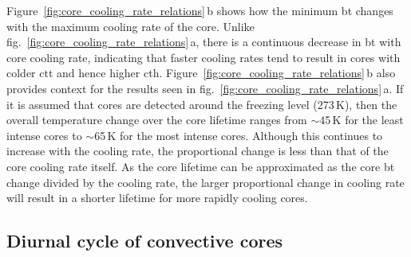 Figure~\ref{fig:core_cooling_rate_relations}\,b shows how the minimum \acrshort{bt} changes with the maximum cooling rate of the core.
Unlike fig.~\ref{fig:core_cooling_rate_relations}\,a, there is a continuous decrease in \acrshort{bt} with core cooling rate, indicating that faster cooling rates tend to result in cores with colder \acrshort{ctt} and hence higher \acrshort{cth}.
Figure~\ref{fig:core_cooling_rate_relations}\,b also provides context for the results seen in fig.~\ref{fig:core_cooling_rate_relations}\,a.
If it is assumed that cores are detected around the freezing level (273\,\unit{K}), then the overall temperature change over the core lifetime ranges from $\sim$45\,\unit{K} for the least intense cores to $\sim$65\,\unit{K} for the most intense cores.
Although this continues to increase with the cooling rate, the proportional change is less than that of the core cooling rate itself.
As the core lifetime can be approximated as the core \acrshort{bt} change divided by the cooling rate, the larger proportional change in cooling rate will result in a shorter lifetime for more rapidly cooling cores.



\subsection{Diurnal cycle of convective cores}

